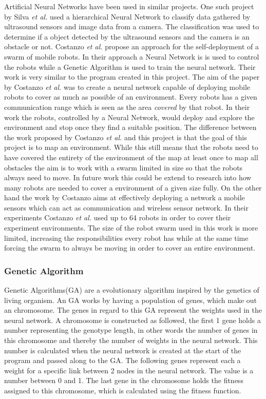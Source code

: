 Artificial Neural Networks have been used in similar projects. 
One such project by Silva \textit{et al.}\cite{Silva2008} used a hierarchical Neural Network to classify data gathered by ultrasound sensors and image data from a camera. The classification was used to determine if a object detected by the ultrasound sensors and the camera is an obstacle or not. 
Costanzo \textit{et al.}\cite{Costanzo20121047} propose an approach for the self-deployment of a swarm of mobile robots. In their approach a Neural Network is is used to control the robots while a Genetic Algorithm is used to train the neural network. 
Their work is very similar to the program created in this project. 
The aim of the paper by Costanzo \textit{et al.} was to create a neural network capable of deploying mobile robots to cover as much as possible of an environment. 
Every robots has a given communication range which is seen as the area \textit{covered} by that robot. In their work the robots, controlled by a Neural Network, would deploy and explore the environment and stop once they find a suitable position.
The difference between the work proposed by Costanzo \textit{et al.} and this project is that the goal of this project is to map an environment. While this still means that the robots need to have covered the entirety of the environment of the map at least once to map all obstacles the aim is to work with a swarm limited in size so that the robots always need to move. In future work this could be extend to research into how many robots are needed to cover a environment of a given size fully.
On the other hand the work by Costanzo aims at effectively deploying a network a mobile sensors which can act as communication and wireless sensor network. In their experiments Costanzo \textit{et al.} used up to 64 robots in order to cover their experiment environments. The size of the robot swarm used in this work is more limited, increasing the responsibilities every robot has while at the same time forcing the swarm to always be moving in order to cover an entire environment.  

\subsubsection{Genetic Algorithm}
Genetic Algorithms(GA) are a evolutionary algorithm inspired by the genetics of living organism. 
An GA works by having a population  of genes, which make out an chromosome. The genes in regard to this GA represent the weights used in the neural network. 
A chromosome is constructed as followed, the first 1 gene holds a number representing the genotype length, in other words the number of genes in this chromosome and thereby the number of weights in the neural network. This number is calculated when the neural network is created at the start of the program and passed along to the GA.
The following genes represent each a weight for a specific link between 2 nodes in the neural network. The value is a number between 0 and 1. 
The last gene in the chromosome holds the fitness assigned to this chromosome, which is calculated using the fitness function.\\

